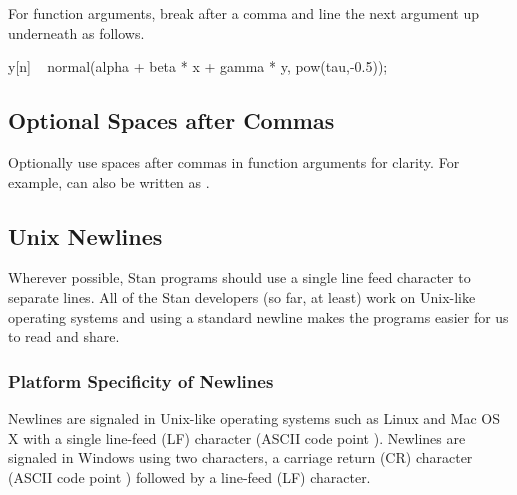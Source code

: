 For function arguments, break after a comma and line the next
argument up underneath as follows.
%
\begin{stancode}
y[n] ~ normal(alpha + beta * x + gamma * y,
              pow(tau,-0.5));
\end{stancode}
%

\subsection{Optional Spaces after Commas}

Optionally use spaces after commas in function arguments for clarity.
For example,  can also be
written as .



\subsection{Unix Newlines}

Wherever possible, Stan programs should use a single line feed 
character to separate lines.  All of the Stan developers (so far, at 
least) work on Unix-like operating systems and using a standard 
newline makes the programs easier for us to read and share.  

\subsubsection{Platform Specificity of Newlines}

Newlines are signaled in Unix-like operating systems such as Linux and
Mac OS X with a single line-feed (LF) character (ASCII code point
).  Newlines are signaled in Windows using two characters,
a carriage return (CR) character (ASCII code point )
followed by a line-feed (LF) character.



